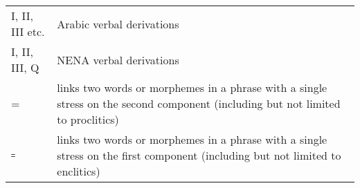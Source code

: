 \documentclass[output=paper]{langsci/langscibook}
\begin{document}
\begin{tabularx}{1\textwidth}{@{}lQ@{}}
I, II, III etc. & Arabic verbal derivations\\
I, II, III, Q & NENA verbal derivations\\
= & links two words or morphemes in a phrase with a single {stress} on the second component (including but not limited to proclitics)\\
꞊ & links two words or morphemes in a phrase with a single {stress} on the first component (including but not limited to enclitics)
\end{tabularx}%

{\sloppy\printbibliography[heading=subbibliography,notkeyword=this]}
\end{document}
